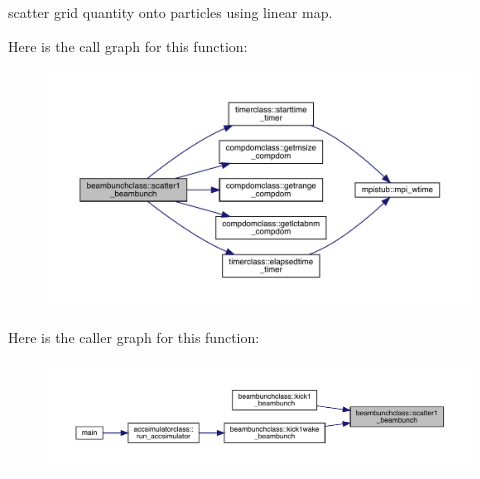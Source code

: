 scatter grid quantity onto particles using linear map. 

Here is the call graph for this function\+:\nopagebreak
\begin{figure}[H]
\begin{center}
\leavevmode
\includegraphics[width=350pt]{namespacebeambunchclass_a023a12f9279f0764fc57deda1bcb852f_cgraph}
\end{center}
\end{figure}
Here is the caller graph for this function\+:\nopagebreak
\begin{figure}[H]
\begin{center}
\leavevmode
\includegraphics[width=350pt]{namespacebeambunchclass_a023a12f9279f0764fc57deda1bcb852f_icgraph}
\end{center}
\end{figure}
\mbox{\label{namespacebeambunchclass_a8a96c99996275cf03ceec41dc011695e}} 
